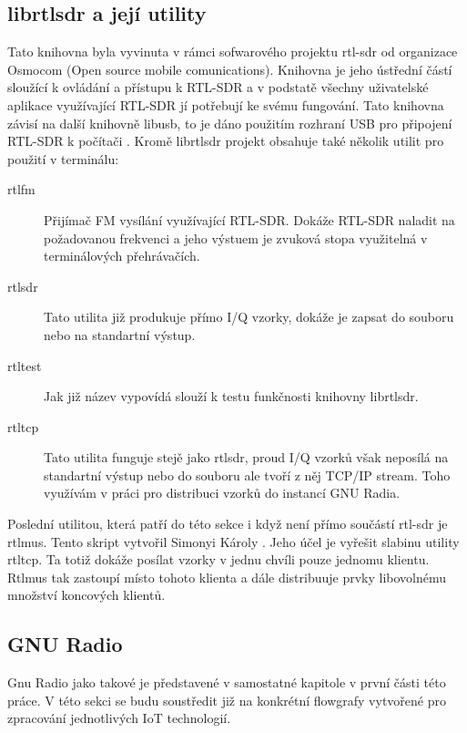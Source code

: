 \documentclass{ctuthesis}
\begin{document}
\subsection{librtlsdr a její utility}
Tato knihovna byla vyvinuta v rámci sofwarového projektu rtl-sdr od organizace Osmocom (Open source mobile comunications). Knihovna je jeho ústřední částí sloužící k ovládání a přístupu k RTL-SDR a v podstatě všechny uživatelské aplikace využívající RTL-SDR jí potřebují ke svému fungování. Tato knihovna závisí na další knihovně libusb, to je dáno použitím rozhraní USB pro připojení RTL-SDR k počítači \cite{osmocom}. Kromě librtlsdr projekt obsahuje také několik utilit pro použití v terminálu:
\begin{description}
\item[rtl\textunderscore fm]
Přijímač FM vysílání využívající RTL-SDR. Dokáže RTL-SDR naladit na požadovanou frekvenci a jeho výstuem je zvuková stopa využitelná v terminálových přehrávačích.
\item[rtl\textunderscore sdr]
Tato utilita již produkuje přímo I/Q vzorky, dokáže je zapsat do souboru nebo na standartní výstup.
\item[rtl\textunderscore test]
Jak již název vypovídá slouží k testu funkčnosti knihovny librtlsdr.
\item[rtl\textunderscore tcp]
Tato utilita funguje stejě jako rtl\textunderscore sdr, proud I/Q vzorků však neposílá na standartní výstup nebo do souboru ale tvoří z něj TCP/IP stream. Toho využívám v práci pro distribuci vzorků do instancí GNU Radia.
\end{description}

Poslední utilitou, která patří do této sekce i když není přímo součástí rtl-sdr je rtl\textunderscore mus. Tento skript vytvořil Simonyi Károly \cite{rtlmus}. Jeho účel je vyřešit slabinu utility rtl\textunderscore tcp. Ta totiž dokáže posílat vzorky v jednu chvíli pouze jednomu klientu. Rtl\textunderscore mus tak zastoupí místo tohoto klienta a dále distribuuje prvky libovolnému množství koncových klientů.

\subsection{GNU Radio}
Gnu Radio jako takové je představené v samostatné kapitole v první části této práce. V této sekci se budu soustředit již na konkrétní flowgrafy vytvořené pro zpracování jednotlivých IoT technologií.
\end{document}
